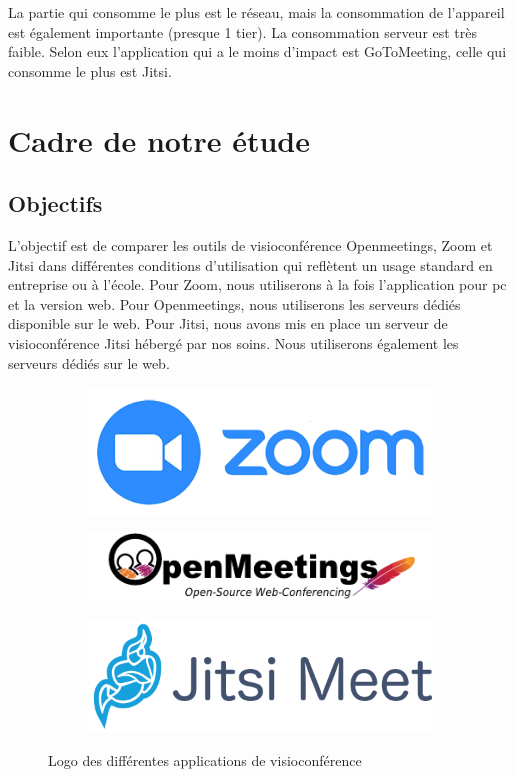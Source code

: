 \documentclass[11pt,a4paper]{report}
\begin{document}
La partie qui consomme le plus est le réseau, mais la consommation de l'appareil est également importante (presque 1 tier). La consommation serveur est très faible. Selon eux l'application qui a le moins d'impact est GoToMeeting, celle qui consomme le plus est Jitsi.

\chapter{Cadre de notre étude}
\section{Objectifs}
L'objectif est de comparer les outils de visioconférence Openmeetings, Zoom et Jitsi dans différentes conditions d'utilisation qui reflètent un usage standard en entreprise ou à l'école. Pour Zoom, nous utiliserons à la fois l'application pour pc et la version web. Pour Openmeetings, nous utiliserons les serveurs dédiés disponible sur le web. Pour Jitsi, nous avons mis en place un serveur de visioconférence Jitsi hébergé par nos soins. Nous utiliserons également les serveurs dédiés sur le web.

\begin{figure}[h]
\begin{subfigure}
  \centering
  \includegraphics[width=.3\linewidth]{zoom-logo (1).png}
\end{subfigure}
\begin{subfigure}
  \centering
  \includegraphics[width=.3\linewidth]{logo.png}
\end{subfigure}
\begin{subfigure}
  \centering
  \includegraphics[width=.3\linewidth]{logo-jitsi-meet.png}
\end{subfigure}
\caption{Logo des différentes applications de visioconférence}
\label{fig:logos}
\end{figure}
\end{document}

